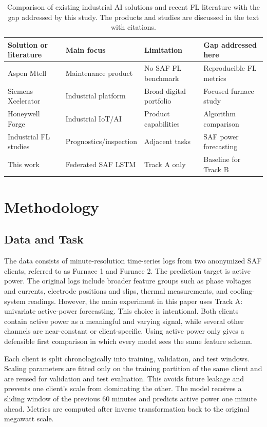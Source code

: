 \documentclass[pdflatex,sn-mathphys-num]{sn-jnl}
\theoremstyle{thmstyleone}%
\theoremstyle{thmstyletwo}%
\theoremstyle{thmstylethree}%
\begin{document}
\begin{table}[t]
\centering
\footnotesize
\begin{tabular}{llll}
\toprule
Solution or literature & Main focus & Limitation & Gap addressed here \\
\midrule
Aspen Mtell & Maintenance product & No SAF FL benchmark & Reproducible FL metrics \\
Siemens Xcelerator & Industrial platform & Broad digital portfolio & Focused furnace study \\
Honeywell Forge & Industrial IoT/AI & Product capabilities & Algorithm comparison \\
Industrial FL studies & Prognostics/inspection & Adjacent tasks & SAF power forecasting \\
This work & Federated SAF LSTM & Track A only & Baseline for Track B \\
\bottomrule
\end{tabular}
\caption{Comparison of existing industrial AI solutions and recent FL literature with the gap addressed by this study. The products and studies are discussed in the text with citations.}
\label{tab:solution-comparison}
\end{table}

\section{Methodology}\label{sec:methodology}

\subsection{Data and Task}\label{sec:data}

The data consists of minute-resolution time-series logs from two anonymized SAF clients, referred to as Furnace 1 and Furnace 2. The prediction target is active power. The original logs include broader feature groups such as phase voltages and currents, electrode positions and slips, thermal measurements, and cooling-system readings. However, the main experiment in this paper uses Track A: univariate active-power forecasting. This choice is intentional. Both clients contain active power as a meaningful and varying signal, while several other channels are near-constant or client-specific. Using active power only gives a defensible first comparison in which every model sees the same feature schema.

Each client is split chronologically into training, validation, and test windows. Scaling parameters are fitted only on the training partition of the same client and are reused for validation and test evaluation. This avoids future leakage and prevents one client's scale from dominating the other. The model receives a sliding window of the previous 60 minutes and predicts active power one minute ahead. Metrics are computed after inverse transformation back to the original megawatt scale.
\end{document}
